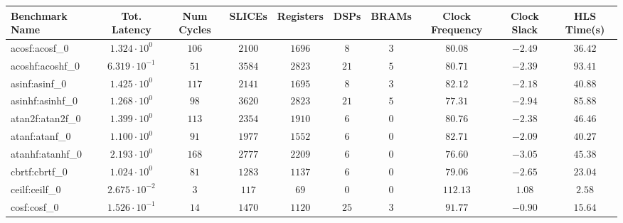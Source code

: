 \begin{tabular}{|l|c|c|c|c|c|c|c|c|c|}
\hline
Benchmark Name               & Tot. Latency            & Num Cycles & SLICEs    & Registers & DSPs    & BRAMs  & Clock Frequency & Clock Slack & HLS Time(s) \\
\hline
acosf:acosf\_0               & $ 1.324 \cdot 10^{0}  $ & $ 106    $ & $ 2100  $ & $ 1696  $ & $ 8   $ & $ 3  $ & $ 80.08       $ & $ -2.49   $ & $ 36.42   $ \\
acoshf:acoshf\_0             & $ 6.319 \cdot 10^{-1} $ & $ 51     $ & $ 3584  $ & $ 2823  $ & $ 21  $ & $ 5  $ & $ 80.71       $ & $ -2.39   $ & $ 93.41   $ \\
asinf:asinf\_0               & $ 1.425 \cdot 10^{0}  $ & $ 117    $ & $ 2141  $ & $ 1695  $ & $ 8   $ & $ 3  $ & $ 82.12       $ & $ -2.18   $ & $ 40.88   $ \\
asinhf:asinhf\_0             & $ 1.268 \cdot 10^{0}  $ & $ 98     $ & $ 3620  $ & $ 2823  $ & $ 21  $ & $ 5  $ & $ 77.31       $ & $ -2.94   $ & $ 85.88   $ \\
atan2f:atan2f\_0             & $ 1.399 \cdot 10^{0}  $ & $ 113    $ & $ 2354  $ & $ 1910  $ & $ 6   $ & $ 0  $ & $ 80.76       $ & $ -2.38   $ & $ 46.46   $ \\
atanf:atanf\_0               & $ 1.100 \cdot 10^{0}  $ & $ 91     $ & $ 1977  $ & $ 1552  $ & $ 6   $ & $ 0  $ & $ 82.71       $ & $ -2.09   $ & $ 40.27   $ \\
atanhf:atanhf\_0             & $ 2.193 \cdot 10^{0}  $ & $ 168    $ & $ 2777  $ & $ 2209  $ & $ 6   $ & $ 0  $ & $ 76.60       $ & $ -3.05   $ & $ 45.38   $ \\
cbrtf:cbrtf\_0               & $ 1.024 \cdot 10^{0}  $ & $ 81     $ & $ 1283  $ & $ 1137  $ & $ 6   $ & $ 0  $ & $ 79.06       $ & $ -2.65   $ & $ 23.04   $ \\
ceilf:ceilf\_0               & $ 2.675 \cdot 10^{-2} $ & $ 3      $ & $ 117   $ & $ 69    $ & $ 0   $ & $ 0  $ & $ 112.13      $ & $ 1.08    $ & $ 2.58    $ \\
cosf:cosf\_0                 & $ 1.526 \cdot 10^{-1} $ & $ 14     $ & $ 1470  $ & $ 1120  $ & $ 25  $ & $ 3  $ & $ 91.77       $ & $ -0.90   $ & $ 15.64   $ \\

\end{tabular}
